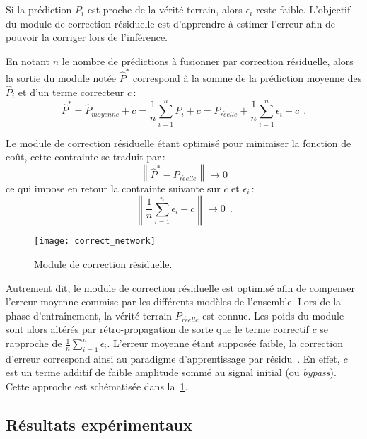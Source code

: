 Si la prédiction $P_i$ est proche de la vérité terrain, alors $\epsilon_i$ reste faible. L'objectif du module de correction résiduelle est d'apprendre à estimer l'erreur afin de pouvoir la corriger lors de l'inférence.

En notant $n$ le nombre de prédictions à fusionner par correction résiduelle, alors la sortie du module notée $\hat{P}^*$ correspond à la somme de la prédiction moyenne des $\hat{P}_i$ et d'un terme correcteur $c$\,:
\begin{equation}
\hat{P}^* = \hat{P}_\mathit{moyenne} + c = \frac{1}{n} \sum_{i=1}^n P_i + c = P_\mathit{r\acute{e}elle} + \frac{1}{n} \sum_{i=1}^n \epsilon_i + c~~.
\label{eq:residual_correction}
\end{equation}

Le module de correction résiduelle étant optimisé pour minimiser la fonction de coût, cette contrainte se traduit par\,:
\begin{equation}
\left\lVert \hat{P}^* - P_\mathit{r\acute{e}elle} \right\rVert \rightarrow 0
\end{equation}
ce qui impose en retour la contrainte suivante sur $c$ et $\epsilon_i$\,:
\begin{equation}
\left\lVert \frac{1}{n} \sum_{i=1}^n \epsilon_i - c \right\rVert \rightarrow 0~~.
\end{equation}

\begin{figure}[t]
  \centering
  \texttt{[image: correct\_network]}
  \caption{Module de correction résiduelle.}
  \label{fig:correction_network}
\end{figure}

Autrement dit, le module de correction résiduelle est optimisé afin de compenser l'erreur moyenne commise par les différents modèles de l'ensemble. Lors de la phase d'entraînement, la vérité terrain $P_\mathit{r\acute{e}elle}$ est connue. Les poids du module sont alors altérés par rétro-propagation de sorte que le terme correctif $c$ se rapproche de $\frac{1}{n}\sum_{i=1}^n \epsilon_i$. L'erreur moyenne étant supposée faible, la correction d'erreur correspond ainsi au paradigme d'apprentissage par résidu~\cite{he_deep_2016}. En effet, $c$ est un terme additif de faible amplitude sommé au signal initial (ou \emph{bypass}). Cette approche est schématisée dans la~\cref{fig:correction_network}.

\subsection{Résultats expérimentaux}

